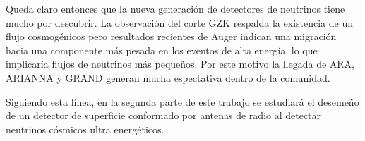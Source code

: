 	Queda claro entonces que la nueva generaci\'on de detectores de neutrinos tiene mucho por descubrir.
	La observaci\'on del corte GZK respalda la existencia de un flujo cosmog\'enicos pero resultados recientes de Auger indican una migraci\'on hacia una componente m\'as pesada en los eventos de alta energ\'ia, lo que implicar\'ia flujos de neutrinos m\'as peque\~nos.
	Por este motivo la llegada de ARA, ARIANNA y GRAND generan mucha espectativa dentro de la comunidad.
	
	Siguiendo esta l\'inea, en la segunda parte de este trabajo se estudiar\'a el deseme\~no de un detector de superficie conformado por antenas de radio al detectar neutrinos c\'osmicos ultra energ\'eticos.
	
	
	

	




